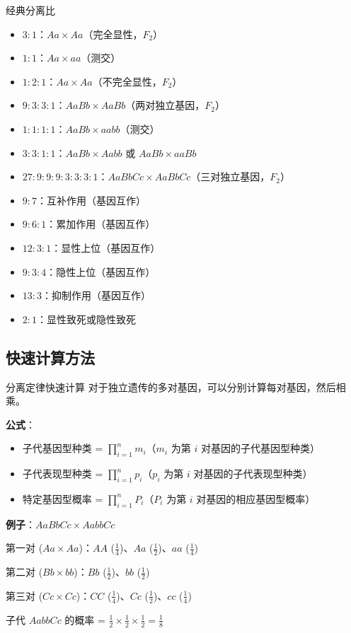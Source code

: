 \documentclass[a4paper,11pt]{ctexart}
\begin{document}
\begin{lemmabox}{经典分离比}
\begin{itemize}[leftmargin=2em]
    \item \textbf{$3:1$}：$Aa \times Aa$（完全显性，$F_2$）
    \item \textbf{$1:1$}：$Aa \times aa$（测交）
    \item \textbf{$1:2:1$}：$Aa \times Aa$（不完全显性，$F_2$）
    \item \textbf{$9:3:3:1$}：$AaBb \times AaBb$（两对独立基因，$F_2$）
    \item \textbf{$1:1:1:1$}：$AaBb \times aabb$（测交）
    \item \textbf{$3:3:1:1$}：$AaBb \times Aabb$ 或 $AaBb \times aaBb$
    \item \textbf{$27:9:9:9:3:3:3:1$}：$AaBbCc \times AaBbCc$（三对独立基因，$F_2$）
    \item \textbf{$9:7$}：互补作用（基因互作）
    \item \textbf{$9:6:1$}：累加作用（基因互作）
    \item \textbf{$12:3:1$}：显性上位（基因互作）
    \item \textbf{$9:3:4$}：隐性上位（基因互作）
    \item \textbf{$13:3$}：抑制作用（基因互作）
    \item \textbf{$2:1$}：显性致死或隐性致死
\end{itemize}
\end{lemmabox}

\subsection{快速计算方法}

\begin{examplebox}{分离定律快速计算}
对于独立遗传的多对基因，可以分别计算每对基因，然后相乘。

\textbf{公式}：
\begin{itemize}[leftmargin=2em]
    \item 子代基因型种类 = $\prod_{i=1}^{n} m_i$（$m_i$ 为第 $i$ 对基因的子代基因型种类）
    \item 子代表现型种类 = $\prod_{i=1}^{n} p_i$（$p_i$ 为第 $i$ 对基因的子代表现型种类）
    \item 特定基因型概率 = $\prod_{i=1}^{n} P_i$（$P_i$ 为第 $i$ 对基因的相应基因型概率）
\end{itemize}

\textbf{例子}：$AaBbCc \times AabbCc$

第一对 ($Aa \times Aa$)：$AA$ ($\frac{1}{4}$)、$Aa$ ($\frac{1}{2}$)、$aa$ ($\frac{1}{4}$)

第二对 ($Bb \times bb$)：$Bb$ ($\frac{1}{2}$)、$bb$ ($\frac{1}{2}$)

第三对 ($Cc \times Cc$)：$CC$ ($\frac{1}{4}$)、$Cc$ ($\frac{1}{2}$)、$cc$ ($\frac{1}{4}$)

子代 $AabbCc$ 的概率 = $\frac{1}{2} \times \frac{1}{2} \times \frac{1}{2} = \frac{1}{8}$
\end{examplebox}
\end{document}
